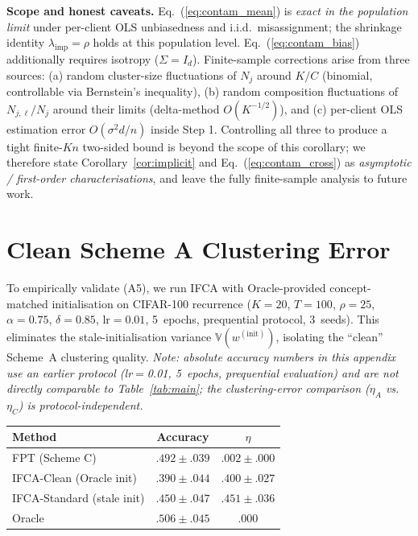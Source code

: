 \documentclass[11pt]{article}
\newcommand{\V}{\mathbb{V}}
\begin{document}
\textbf{Scope and honest caveats.}
Eq.~(\ref{eq:contam_mean}) is \emph{exact in the population limit} under per-client OLS unbiasedness and i.i.d.\ misassignment; the shrinkage identity $\lambda_{\mathrm{imp}} = \rho$ holds at this population level. Eq.~(\ref{eq:contam_bias}) additionally requires isotropy ($\Sigma = I_d$). Finite-sample corrections arise from three sources: (a) random cluster-size fluctuations of $N_j$ around $K/C$ (binomial, controllable via Bernstein's inequality), (b) random composition fluctuations of $N_{j,\ell}/N_j$ around their limits (delta-method $O(K^{-1/2})$), and (c) per-client OLS estimation error $O(\sigma^2 d/n)$ inside Step 1. Controlling all three to produce a tight finite-$Kn$ two-sided bound is beyond the scope of this corollary; we therefore state Corollary~\ref{cor:implicit} and Eq.~(\ref{eq:contam_cross}) as \emph{asymptotic / first-order characterisations}, and leave the fully finite-sample analysis to future work.


\section{Clean Scheme A Clustering Error}
\label{app:clean_eta}

To empirically validate (A5), we run IFCA with Oracle-provided concept-matched initialisation on CIFAR-100 recurrence ($K{=}20$, $T{=}100$, $\rho{=}25$, $\alpha{=}0.75$, $\delta{=}0.85$, lr${=}0.01$, 5~epochs, prequential protocol, 3~seeds).
This eliminates the stale-initialisation variance $\V(w^{(\mathrm{init})})$, isolating the ``clean'' Scheme~A clustering quality.
\emph{Note: absolute accuracy numbers in this appendix use an earlier protocol (lr$=$0.01, 5~epochs, prequential evaluation) and are not directly comparable to Table~\ref{tab:main}; the clustering-error comparison ($\eta_A$ vs.\ $\eta_C$) is protocol-independent.}

\begin{center}
\small
\begin{tabular}{lcc}
\toprule
Method & Accuracy & $\eta$ \\
\midrule
FPT (Scheme C) & $.492 \pm .039$ & $.002 \pm .000$ \\
IFCA-Clean (Oracle init) & $.390 \pm .044$ & $.400 \pm .027$ \\
IFCA-Standard (stale init) & $.450 \pm .047$ & $.451 \pm .036$ \\
Oracle & $.506 \pm .045$ & $.000$ \\
\bottomrule
\end{tabular}
\end{center}
\end{document}
